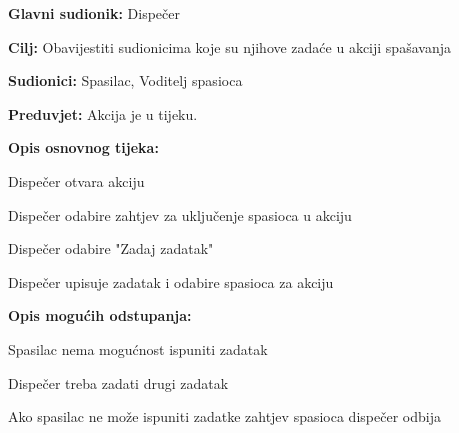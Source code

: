 		\begin{packed_item}
			
			\item \textbf{Glavni sudionik: }Dispečer
			\item  \textbf{Cilj:} Obavijestiti sudionicima koje su njihove zadaće u akciji spašavanja
			\item  \textbf{Sudionici:} Spasilac, Voditelj spasioca
			\item  \textbf{Preduvjet:} Akcija je u tijeku.
			\item  \textbf{Opis osnovnog tijeka:}
			
			\item[] \begin{packed_enum}
				
				\item Dispečer otvara akciju
				\item Dispečer odabire zahtjev za uključenje spasioca u akciju
				\item Dispečer odabire "Zadaj zadatak"
				\item Dispečer upisuje zadatak i odabire spasioca za akciju
				
			\end{packed_enum}
			
			\item  \textbf{Opis mogućih odstupanja:}
			
			\item[] \begin{packed_item}
				
				\item[4.a] Spasilac nema mogućnost ispuniti zadatak
				\item[] \begin{packed_enum}
					
					\item Dispečer treba zadati drugi zadatak
					\item Ako spasilac ne može ispuniti zadatke zahtjev spasioca dispečer odbija\\
					
				\end{packed_enum}	
			\end{packed_item}
		\end{packed_item}
		
